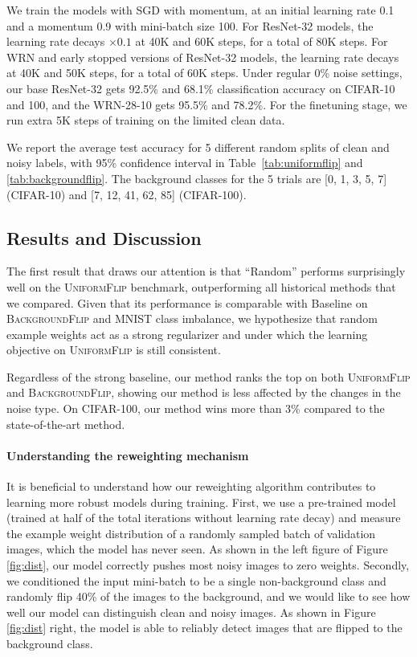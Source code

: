 We train the models with SGD with momentum, at an initial learning rate 0.1 and a momentum 0.9 with
mini-batch size 100. For ResNet-32 models, the learning rate decays $\times 0.1$ at 40K and 60K
steps, for a total of 80K steps. For WRN and early stopped versions of ResNet-32 models, the
learning rate decays at 40K and 50K steps, for a total of 60K steps. Under regular 0\% noise
settings, our base ResNet-32 gets 92.5\% and 68.1\% classification accuracy on CIFAR-10 and 100, and
the WRN-28-10 gets 95.5\% and 78.2\%. For the finetuning stage, we run extra 5K steps of training on
the limited clean data.

We report the average test accuracy for 5 different random splits of clean and noisy labels, with
95\% confidence interval in Table~\ref{tab:uniformflip} and \ref{tab:backgroundflip}. The background
classes for the 5 trials are [0, 1, 3, 5, 7] (CIFAR-10) and [7, 12, 41, 62, 85] (CIFAR-100).







\subsection{Results and Discussion}

The first result that draws our attention is that ``Random'' performs surprisingly well on the
\textsc{UniformFlip} benchmark, outperforming all historical methods that we compared. Given that
its performance is comparable with Baseline on \textsc{BackgroundFlip} and MNIST class imbalance, we
hypothesize that random example weights act as a strong regularizer and under which the learning
objective on \textsc{UniformFlip} is still consistent.

Regardless of the strong baseline, our method ranks the top on both \textsc{UniformFlip} and
\textsc{BackgroundFlip}, showing our method is less affected by the changes in the noise type. On
CIFAR-100, our method wins more than 3\% compared to the state-of-the-art method.
\vspace{-0.05in}
\paragraph{Understanding the reweighting mechanism}
It is beneficial to understand how our reweighting algorithm contributes to learning more robust
models during training. First, we use a pre-trained model (trained at half of the total iterations
without learning rate decay) and measure the example weight distribution of a randomly sampled batch
of validation images, which the model has never seen. As shown in the left figure of Figure
\ref{fig:dist}, our model correctly pushes most noisy images to zero weights. Secondly,  we
conditioned the input mini-batch to be a single non-background class and randomly flip 40\% of the
images to the background, and we would like to see how well our model can distinguish clean and
noisy images. As shown in Figure \ref{fig:dist} right, the model is able to reliably detect images
that are flipped to the background class.
\vspace{-0.05in}
